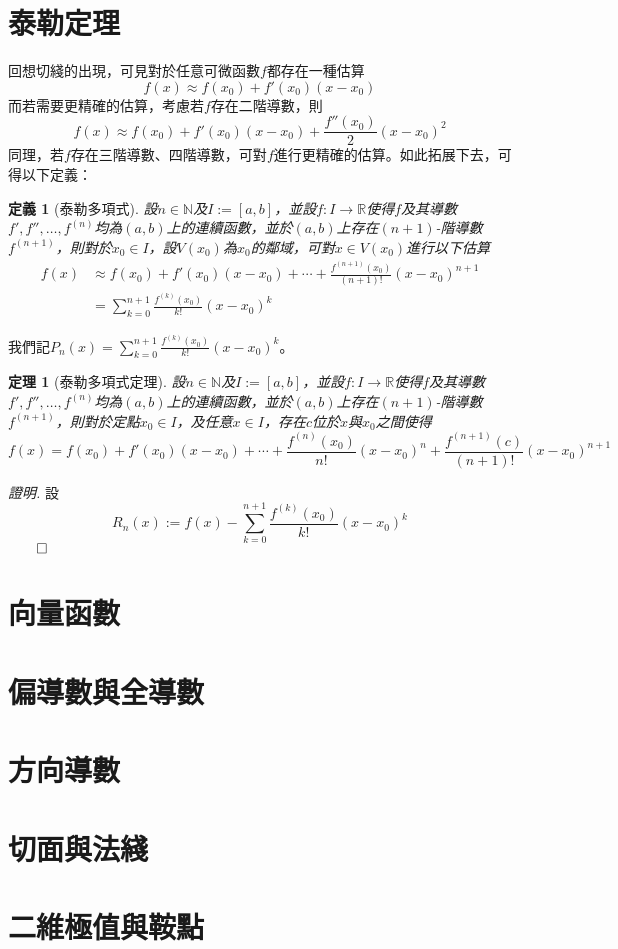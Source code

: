 \documentclass[12pt]{article}
\newtheorem{definition}{定義}
\newtheorem*{theorem}{定理}
\renewenvironment*{proof}{\textit{證明.}}{\hfill$\qed$}
\begin{document}
    \section*{泰勒定理}

    回想切綫的出現，可見對於任意可微函數$f$都存在一種估算$$f(x)\approx f(x_0)+f'(x_0)(x-x_0)$$而若需要更精確的估算，考慮若$f$存在二階導數，則$$f(x)\approx f(x_0)+f'(x_0)(x-x_0)+\frac{f''(x_0)}{2}(x-x_0)^2$$同理，若$f$存在三階導數、四階導數，可對$f$進行更精確的估算。如此拓展下去，可得以下定義：

    \begin{definition}[泰勒多項式]
        設$n\in\mathbb{N}$及$I:=[a,b]$，並設$f:I\to\mathbb{R}$使得$f$及其導數$f',f'',\dots,f^{(n)}$均為$(a,b)$上的連續函數，並於$(a,b)$上存在$(n+1)$-階導數$f^{(n+1)}$，則對於$x_0\in I$，設$V(x_0)$為$x_0$的鄰域，可對$x\in V(x_0)$進行以下估算\begin{align*}
            f(x)&\approx f(x_0)+f'(x_0)(x-x_0)+\cdots+\frac{f^{(n+1)}(x_0)}{(n+1)!}(x-x_0)^{n+1}\\
            &=\sum_{k=0}^{n+1}\frac{f^{(k)}(x_0)}{k!}(x-x_0)^k
        \end{align*}
    \end{definition}

    我們記$\displaystyle P_n(x)=\sum_{k=0}^{n+1}\frac{f^{(k)}(x_0)}{k!}(x-x_0)^k$。

    \begin{theorem}[泰勒多項式定理]
        設$n\in\mathbb{N}$及$I:=[a,b]$，並設$f:I\to\mathbb{R}$使得$f$及其導數$f',f'',\dots,f^{(n)}$均為$(a,b)$上的連續函數，並於$(a,b)$上存在$(n+1)$-階導數$f^{(n+1)}$，則對於定點$x_0\in I$，及任意$x\in I$，存在$c$位於$x$與$x_0$之間使得$$f(x)= f(x_0)+f'(x_0)(x-x_0)+\cdots+\frac{f^{(n)}(x_0)}{n!}(x-x_0)^{n}+\frac{f^{(n+1)}(c)}{(n+1)!}(x-x_0)^{n+1}$$
    \end{theorem}

    \begin{proof}
        設$$R_n(x):=f(x)-\sum_{k=0}^{n+1}\frac{f^{(k)}(x_0)}{k!}(x-x_0)^k$$
    \end{proof}
    
    \section*{向量函數}

    \section*{偏導數與全導數}

    \section*{方向導數}

    \section*{切面與法綫}

    \section*{二維極值與鞍點}
\end{document}
